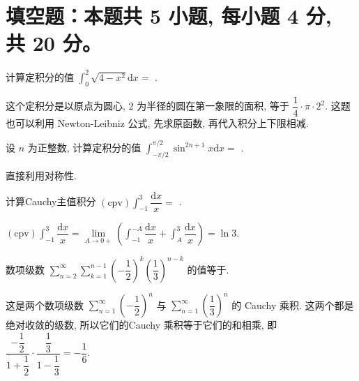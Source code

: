 \section{填空题：本题共 5 小题, 每小题 4 分, 共 20 分。}



\begin{question}
  计算定积分的值 $\int_{0}^{2} \sqrt{4 - x^2} \mathrm{d} x = $ \fillin[$\pi$].
\end{question}

\begin{solution}
  这个定积分是以原点为圆心, $2$ 为半径的圆在第一象限的面积, 等于 $\dfrac{1}{4} \cdot \pi \cdot 2^2.$ 这题也可以利用 Newton-Leibniz 公式, 先求原函数, 再代入积分上下限相减.
\end{solution}

\begin{question}
  设 $n$ 为正整数, 计算定积分的值 $\int_{-\pi/2}^{\pi/2} \sin^{2n+1} x \mathrm{d} x = $ \fillin[$0$].
\end{question}

\begin{solution}
  直接利用对称性.
\end{solution}

\begin{question}
  计算Cauchy主值积分 $(\text{cpv}) \int_{-1}^{3} \dfrac{\mathrm{d}x}{x} = $ \fillin[$\ln 3$].
\end{question}

\begin{solution}
  $(\text{cpv}) \int_{-1}^{3} \dfrac{\mathrm{d}x}{x} = \lim\limits_{A \to 0+} \left( \int_{-1}^{-A} \dfrac{\mathrm{d}x}{x} + \int_{A}^{3} \dfrac{\mathrm{d}x}{x} \right) = \ln 3.$
\end{solution}

\begin{question}
  数项级数 $\sum\limits_{n=2}^\infty \sum\limits_{k=1}^{n-1} \left(-\dfrac{1}{2}\right)^k \left(\dfrac{1}{3}\right)^{n-k}$ 的值等于\fillin[$-\dfrac{1}{6}$].
\end{question}

\begin{solution}
  这是两个数项级数 $\sum\limits_{n=1}^\infty \left(-\dfrac{1}{2}\right)^n$ 与 $\sum\limits_{n=1}^\infty \left(\dfrac{1}{3}\right)^n$ 的 Cauchy 乘积. 这两个都是绝对收敛的级数, 所以它们的Cauchy 乘积等于它们的和相乘, 即 $\dfrac{-\dfrac{1}{2}}{1 + \dfrac{1}{2}} \cdot \dfrac{\dfrac{1}{3}}{1 - \dfrac{1}{3}} = -\dfrac{1}{6}.$
\end{solution}


